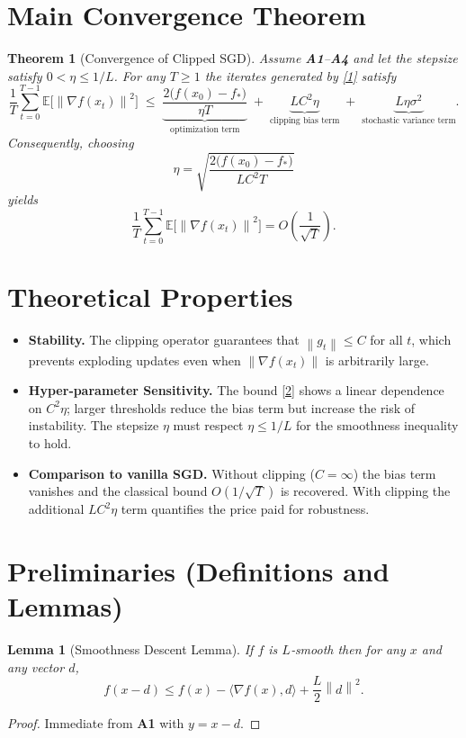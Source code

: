 \documentclass{article}
\newtheorem{theorem}{Theorem}
\newtheorem{lemma}{Lemma}
\newcommand{\norm}[1]{\left\lVert#1\right\rVert}
\newcommand{\E}{\mathbb{E}}
\begin{document}
\section*{Main Convergence Theorem}
\begin{theorem}[Convergence of Clipped SGD]\label{thm:main}
Assume \textbf{A1}–\textbf{A4} and let the stepsize satisfy
$0<\eta\le 1/L$.  For any $T\ge1$ the iterates generated by
\eqref{1} satisfy
\[
\frac{1}{T}\sum_{t=0}^{T-1}\E\!\bigl[\norm{\nabla f(x_t)}^2\bigr]
\;\le\;
\underbrace{\frac{2\bigl(f(x_0)-f_*\bigr)}{\eta T}}_{\displaystyle\text{optimization term}}
\;+\;
\underbrace{L C^{2}\eta}_{\displaystyle\text{clipping bias term}}
\;+\;
\underbrace{L\eta\sigma^{2}}_{\displaystyle\text{stochastic variance term}} .
\tag{2}
\]
Consequently, choosing
\[
\eta = \sqrt{\frac{2\bigl(f(x_0)-f_*\bigr)}{L C^{2}T}}
\]
yields
\[
\frac{1}{T}\sum_{t=0}^{T-1}\E\!\bigl[\norm{\nabla f(x_t)}^2\bigr]
= O\!\left(\frac{1}{\sqrt{T}}\right) .
\]
\end{theorem}

\section*{Theoretical Properties}
\begin{itemize}
\item \textbf{Stability.} The clipping operator guarantees that
$\norm{g_t}\le C$ for all $t$, which prevents exploding updates even when
$\norm{\nabla f(x_t)}$ is arbitrarily large.
\item \textbf{Hyper‑parameter Sensitivity.}
The bound \eqref{2} shows a linear dependence on $C^{2}\eta$;
larger thresholds reduce the bias term but increase the risk of
instability. The stepsize $\eta$ must respect $\eta\le1/L$ for the
smoothness inequality to hold.
\item \textbf{Comparison to vanilla SGD.}
Without clipping ($C=\infty$) the bias term vanishes and the classical
bound $O(1/\sqrt{T})$ is recovered. With clipping the additional
$L C^{2}\eta$ term quantifies the price paid for robustness.
\end{itemize}

\section*{Preliminaries (Definitions and Lemmas)}
\begin{lemma}[Smoothness Descent Lemma]\label{lem:smooth}
If $f$ is $L$‑smooth then for any $x$ and any vector $d$,
\[
f(x-d)\le f(x)-\langle\nabla f(x),d\rangle+\frac{L}{2}\norm{d}^{2}.
\tag{3}
\]
\end{lemma}
\begin{proof}
Immediate from \textbf{A1} with $y=x-d$.
\end{proof}
\end{document}

